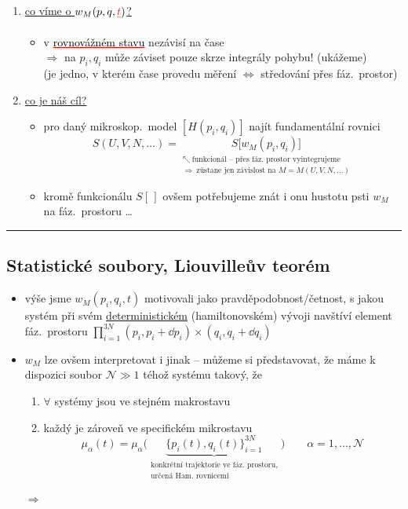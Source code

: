 \begin{enumerate}[label=\arabic*),start=5]
  \item \underline{co víme o $w_M(p,q,\textcolor{Red}{\sout{t}})$?}
  \begin{itemize}
    \item[$\to$] v \textcolor{Red}{\underline{\textcolor{black}{rovnovážném stavu}}} nezávisí na čase \\
          $\Rightarrow$ na $p_i, q_i$ může záviset pouze skrze integrály pohybu! \textcolor{NavyBlue}{(ukážeme)} \\
          (je jedno, v kterém čase provedu měření $\Leftrightarrow$ středování přes fáz.\ prostor)
  \end{itemize}
  \item \underline{co je náš cíl?}
  \begin{itemize}
    \item[$\to$] pro daný mikroskop.\ model $[H(p_i,q_i)]$ najít fundamentální rovnici
    \[
      S(U,V,N,\dots) = \underset{\substack{\nwarrow\ \text{funkcionál -- přes fáz.\ prostor vyintegrujeme}\\ \Rightarrow\ \text{zůstane jen závislost na } M = M(U,V,N,\dots)}}{S\big[w_M(p_i,q_i)\big]}
    \]
    \item[$\to$] kromě funkcionálu $S[\,]$ ovšem potřebujeme znát i onu hustotu psti $w_M$ na fáz.\ prostoru \dots
  \end{itemize}
\end{enumerate}
\noindent\rule{\linewidth}{0.4pt}

\subsection{Statistické soubory, Liouvilleův teorém}
\begin{itemize}
  \item[$\to$] výše jsme $w_M(p_i,q_i,t)$ motivovali jako pravděpodobnost/četnost, s jakou systém při svém \underline{deterministickém} (hamiltonovském) vývoji navštíví element fáz.\ prostoru $\prod_{i=1}^{3N}(p_i,p_i+\dd p_i)\times(q_i,q_i+\dd q_i)$
  \item[$\to$] $w_M$ lze ovšem interpretovat i jinak -- můžeme si představovat, že máme k dispozici soubor $\mathcal N\gg 1$  téhož systému takový, že
  \begin{enumerate}[label=\arabic*)]
    \item $\forall$ systémy jsou ve stejném makrostavu
    \item každý je zároveň ve specifickém mikrostavu
    \[
      \mu_\alpha(t) = \mu_\alpha\big(\underbrace{\{p_i(t),q_i(t)\}_{i=1}^{3N}}_{\substack{\text{konkrétní trajektorie ve fáz.\ prostoru,}\\ \text{určená Ham.\ rovnicemi}}}\big) \qquad \alpha = 1,\dots,\mathcal N
    \]
  \end{enumerate}
  $\Rightarrow$ 
\end{itemize}

